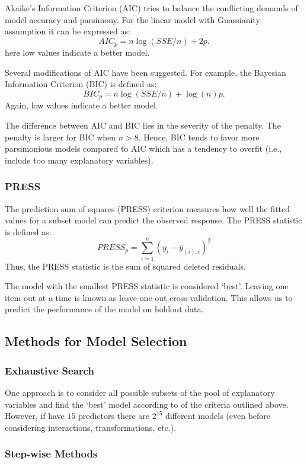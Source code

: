 Akaike's Information Criterion (AIC) tries to balance the conflicting demands of model accuracy and parsimony. 
For the linear model with Guassianity assumption it  can be expressed as:
$$
AIC_p = n \log(SSE/n) + 2p.
$$
here low values indicate a better model.


Several modifications of AIC have been suggested.
For example, the Bayesian Information Criterion (BIC) is defined as:
$$
BIC_p = n \log(SSE/n) + \log(n)p.
$$
Again, low values indicate a better model.

The difference between AIC and BIC lies in the severity of the penalty. 
The penalty is larger for BIC when $n>8$. 
Hence, BIC tends to favor more parsimonious models compared to AIC which has a tendency to overfit (i.e., include too many explanatory variables).


\subsubsection{PRESS}

The prediction sum of squares (PRESS) criterion measures how well the fitted values for a subset model can predict the observed response.
The PRESS statistic is defined as:
$$
PRESS_p = \sum_{i=1}^n (y_i - \hat y_{(i),i})^2
$$ 
Thus, the PRESS statistic is the sum of squared deleted residuals.

The model with the smallest PRESS statistic is considered  `best'. 
Leaving one item out at a time is known as leave-one-out cross-validation.
This allows us to predict the performance of the model on holdout data.


\subsection{Methods for Model Selection}

\subsubsection{Exhaustive Search}

One approach is to consider all possible subsets of the pool of explanatory variables and find the `best' model according to of the criteria outlined above. However, if have $15$ predictors there are $2^{15}$ different models (even before considering interactions, transformations, etc.).


\subsubsection{Step-wise Methods}


